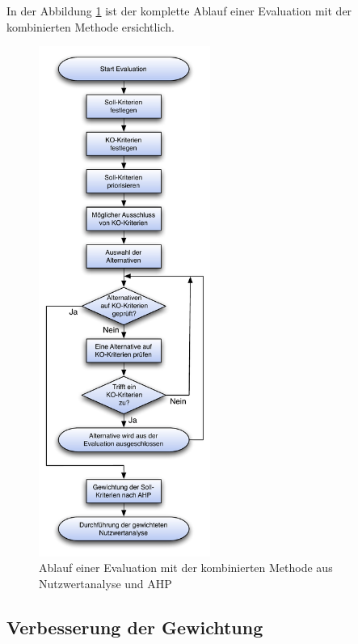   In der Abbildung \ref{img:ablaufEvaluation} ist der komplette Ablauf einer
  Evaluation mit der kombinierten Methode ersichtlich.
    
  \begin{figure}[ht]
    \begin{center}
      \includegraphics[width=0.5\textwidth]{./image/ablaufEvaluation.pdf}
      \caption{Ablauf einer Evaluation mit der kombinierten Methode aus
      Nutzwertanalyse und \ac{AHP}}
      \label{img:ablaufEvaluation}
    \end{center}
  \end{figure}
  
  \subsection{Verbesserung der Gewichtung}
  

